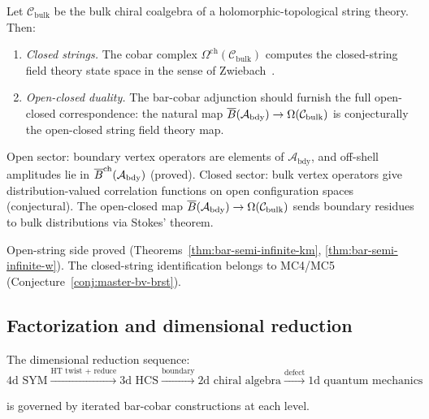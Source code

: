 \begin{conjecture}
\label{conj:closed-string-cobar}
Let $\mathcal{C}_{\mathrm{bulk}}$ be the bulk chiral coalgebra of
a holomorphic-topological string theory.  Then:
\begin{enumerate}
\item \emph{Closed strings.} The cobar complex
  $\Omega^{\mathrm{ch}}(\mathcal{C}_{\mathrm{bulk}})$ computes the
  closed-string field theory state space in the sense of
  Zwiebach~\cite{Zwi93}.
\item \emph{Open-closed duality.} The bar-cobar adjunction
  should furnish the full open-closed correspondence: the natural map
  $\overline{B}(\mathcal{A}_{\mathrm{bdy}}) \to
  \Omega(\mathcal{C}_{\mathrm{bulk}})$ is conjecturally the open-closed string
  field theory map.
\end{enumerate}
\end{conjecture}

\begin{remark}[Evidence]
Open sector: boundary vertex operators are elements of $\mathcal{A}_{\mathrm{bdy}}$, and off-shell amplitudes lie in $\overline{B}^{\mathrm{ch}}(\mathcal{A}_{\mathrm{bdy}})$ (proved).  Closed sector: bulk vertex operators give distribution-valued correlation functions on open configuration spaces (conjectural).  The open-closed map $\overline{B}(\mathcal{A}_{\mathrm{bdy}}) \to \Omega(\mathcal{C}_{\mathrm{bulk}})$ sends boundary residues to bulk distributions via Stokes' theorem.
\end{remark}

\begin{remark}[Scope]
Open-string side proved (Theorems~\ref{thm:bar-semi-infinite-km}, \ref{thm:bar-semi-infinite-w}).  The closed-string identification belongs to MC4/MC5 (Conjecture~\ref{conj:master-bv-brst}).
\end{remark}

\subsection{Factorization and dimensional reduction}

\begin{conjecture}\label{conj:factorization-dim-tower}
The dimensional reduction sequence:
\[\text{4d SYM} \xrightarrow{\text{HT twist + reduce}}
\text{3d HCS} \xrightarrow{\text{boundary}}
\text{2d chiral algebra} \xrightarrow{\text{defect}}
\text{1d quantum mechanics}\]

is governed by iterated bar-cobar constructions at each level.
\end{conjecture}

